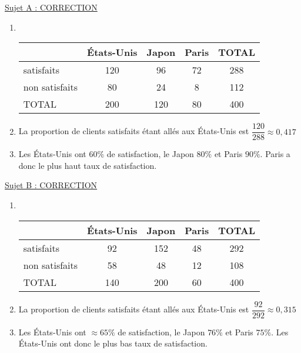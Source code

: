 \documentclass[headerTitle=Interrogation]{exercice}
\begin{document}
{\color{red}
\uline{Sujet A : CORRECTION}}

\begin{enumerate}
	\item \

	      \begin{tabular}{|l|c|c|c|c|}
		      \hline
		                     & États-Unis & Japon & Paris & TOTAL \\ \hline
		      satisfaits     & 120        & 96    & 72    & 288   \\ \hline
		      non satisfaits & 80         & 24    & 8     & 112   \\ \hline
		      TOTAL          & 200        & 120   & 80    & 400   \\ \hline
	      \end{tabular}
	\item La proportion de clients satisfaits étant allés aux États-Unis est $\dfrac{120}{288} ≈ 0,417$
	\item Les États-Unis ont $60\%$ de satisfaction, le Japon $80\%$ et Paris $90\%$. Paris a donc le plus haut taux de satisfaction.
\end{enumerate}

{\color{red}
\uline{Sujet B : CORRECTION}}

\begin{enumerate}
	\item \

	      \begin{tabular}{|l|c|c|c|c|}
		      \hline
		                     & États-Unis & Japon & Paris & TOTAL \\ \hline
		      satisfaits     & 92         & 152   & 48    & 292   \\ \hline
		      non satisfaits & 58         & 48    & 12    & 108   \\ \hline
		      TOTAL          & 140        & 200   & 60    & 400   \\ \hline
	      \end{tabular}
	\item La proportion de clients satisfaits étant allés aux États-Unis est $\dfrac{92}{292} ≈ 0,315$
	\item Les États-Unis ont $≈65\%$ de satisfaction, le Japon $76\%$ et Paris $75\%$. Les États-Unis ont donc le plus bas taux de satisfaction.
\end{enumerate}
\end{document}
